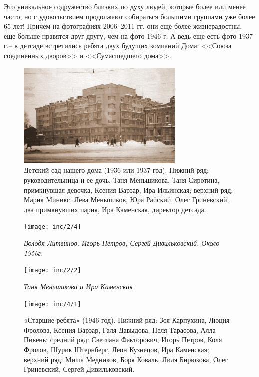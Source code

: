 Это уникальное содружество близких по духу людей, которые более или менее часто, но с удовольствием продолжают собираться большими группами уже более 65 лет! Причем на фотографиях 2006--2011 гг. они еще более жизнерадостны, еще больше нравятся друг другу, чем на фото 1946 г. А ведь еще есть фото 1937 г.-- в детсаде встретились ребята двух будущих компаний Дома: <<Союза соединенных дворов>> и <<Сумасшедшего дома>>.

\newpage


\singlespacing

\thispagestyle{empty} 
\begin{figure}
    \includegraphics[width=80mm]{inc/2/1}
    \caption{Детский сад нашего дома (1936 или 1937 год). Нижний ряд: руководительница и ее дочь, Таня Меньшикова, Таня Сиротина, примкнувшая девочка, Ксения Варзар, Ира Ильинская; верхний ряд: Марик Миникс, Лева Меньшиков, Юра Райский, Олег Гриневский, два примкнувших парня, Ира Каменская, директор детсада.
}
\end{figure}

\begin{figure}
    \begin{minipage}[h!]{49mm}
        \texttt{[image: inc/2/4]}
        \begin{footnotesize}\textit{Володя Литвинов, Игорь Петров, Сергей Дивильковский. Около 1950г.}\end{footnotesize}
    \end{minipage}
    \hspace{5pt}
    \begin{minipage}[h!]{25mm}
        \texttt{[image: inc/2/2]}
        \begin{footnotesize}\textit{Таня Меньшикова и Ира Каменская}\end{footnotesize}
    \end{minipage}
\end{figure}

\begin{figure}[h!]
    \texttt{[image: inc/4/1]}
    \caption{«Старшие ребята» (1946 год). Нижний ряд: Зоя Карпухина, Люция Фролова, Ксения Варзар, Галя Давыдова, Неля Тарасова, Алла Пивень; средний ряд: Светлана Факторович, Игорь Петров, Коля Фролов, Шурик Штернберг, Леон Кузнецов, Ира Каменская; верхний ряд: Миша Медников, Боря Коваль, Лиля Бирюкова, Олег Гриневский, Сергей Дивильковский. }
\end{figure}

